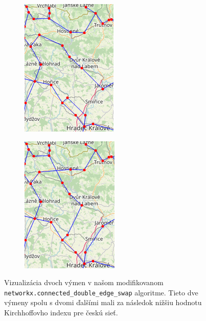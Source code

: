 \documentclass[main.tex]{subfiles}
\begin{document}
\begin{figure}
	\centering
	
	\begin{subfigure}{0.45\linewidth}
		\centering
		\includegraphics[width=0.6\linewidth]{images/before_swap.png}
	\end{subfigure}
	\begin{subfigure}{0.45\linewidth}
		\centering
		\includegraphics[width=0.6\linewidth]{images/after_swap.png}
	\end{subfigure}
	
	\caption{Vizualizácia dvoch výmen v našom modifikovanom \texttt{networkx.connected\_double\_edge\_swap} algoritme. Tieto dve výmeny spolu s dvomi ďalšími mali za následok nižšiu hodnotu Kirchhoffovho indexu pre českú sieť.}
	\label{fig:double_edge_swap}
\end{figure}
\end{document}
